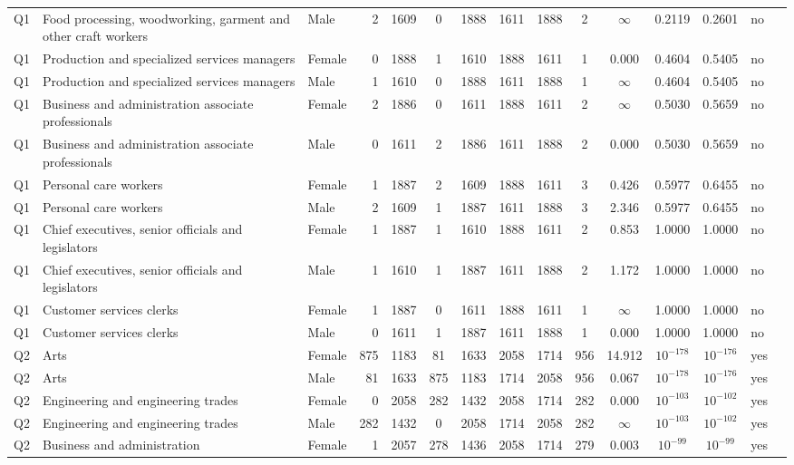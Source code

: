\begin{longtable}{lllrcccccccccll}
Q1 & Food processing, woodworking, garment and other craft workers & Male & 2 & 1609 & 0 & 1888 & 1611 & 1888 & 2 & $\infty$ & 0.2119 & 0.2601 & no \\
Q1 & Production and specialized services managers & Female & 0 & 1888 & 1 & 1610 & 1888 & 1611 & 1 & 0.000 & 0.4604 & 0.5405 & no \\
Q1 & Production and specialized services managers & Male & 1 & 1610 & 0 & 1888 & 1611 & 1888 & 1 & $\infty$ & 0.4604 & 0.5405 & no \\
Q1 & Business and administration associate professionals & Female & 2 & 1886 & 0 & 1611 & 1888 & 1611 & 2 & $\infty$ & 0.5030 & 0.5659 & no \\
Q1 & Business and administration associate professionals & Male & 0 & 1611 & 2 & 1886 & 1611 & 1888 & 2 & 0.000 & 0.5030 & 0.5659 & no \\
Q1 & Personal care workers & Female & 1 & 1887 & 2 & 1609 & 1888 & 1611 & 3 & 0.426 & 0.5977 & 0.6455 & no \\
Q1 & Personal care workers & Male & 2 & 1609 & 1 & 1887 & 1611 & 1888 & 3 & 2.346 & 0.5977 & 0.6455 & no \\
Q1 & Chief executives, senior officials and legislators & Female & 1 & 1887 & 1 & 1610 & 1888 & 1611 & 2 & 0.853 & 1.0000 & 1.0000 & no \\
Q1 & Chief executives, senior officials and legislators & Male & 1 & 1610 & 1 & 1887 & 1611 & 1888 & 2 & 1.172 & 1.0000 & 1.0000 & no \\
Q1 & Customer services clerks & Female & 1 & 1887 & 0 & 1611 & 1888 & 1611 & 1 & $\infty$ & 1.0000 & 1.0000 & no \\
Q1 & Customer services clerks & Male & 0 & 1611 & 1 & 1887 & 1611 & 1888 & 1 & 0.000 & 1.0000 & 1.0000 & no \\
Q2 & Arts & Female & 875 & 1183 & 81 & 1633 & 2058 & 1714 & 956 & 14.912 & $10^{-178}$ & $10^{-176}$ & yes \\
Q2 & Arts & Male & 81 & 1633 & 875 & 1183 & 1714 & 2058 & 956 & 0.067 & $10^{-178}$ & $10^{-176}$ & yes \\
Q2 & Engineering and engineering trades & Female & 0 & 2058 & 282 & 1432 & 2058 & 1714 & 282 & 0.000 & $10^{-103}$ & $10^{-102}$ & yes \\
Q2 & Engineering and engineering trades & Male & 282 & 1432 & 0 & 2058 & 1714 & 2058 & 282 & $\infty$ & $10^{-103}$ & $10^{-102}$ & yes \\
Q2 & Business and administration & Female & 1 & 2057 & 278 & 1436 & 2058 & 1714 & 279 & 0.003 & $10^{-99}$ & $10^{-99}$ & yes \\

\end{longtable}

